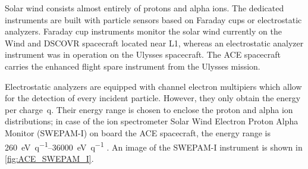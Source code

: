 Solar wind consists almost entirely of protons and alpha ions. The dedicated instruments are built with particle sensors based on Faraday cups or electrostatic analyzers. Faraday cup instruments monitor the solar wind currently on the Wind and DSCOVR spacecraft located near L1, whereas an electrostatic analyzer instrument was in operation on the Ulysses spacecraft. The ACE spacecraft carries the enhanced flight spare instrument from the Ulysses mission.

Electrostatic analyzers are equipped with channel electron multipiers which allow for the detection of every incident particle. However, they only obtain the energy per charge~q. Their energy range is chosen to enclose the proton and alpha ion distributions; in case of the ion spectrometer Solar Wind Electron Proton Alpha Monitor (SWEPAM-I) on board the ACE spacecraft, the energy range is \SIrange{260}{36000}{\electronvolt\per q} \citep{McComas1998a}. An image of the SWEPAM-I instrument is shown in \autoref{fig:ACE_SWEPAM_I}.

